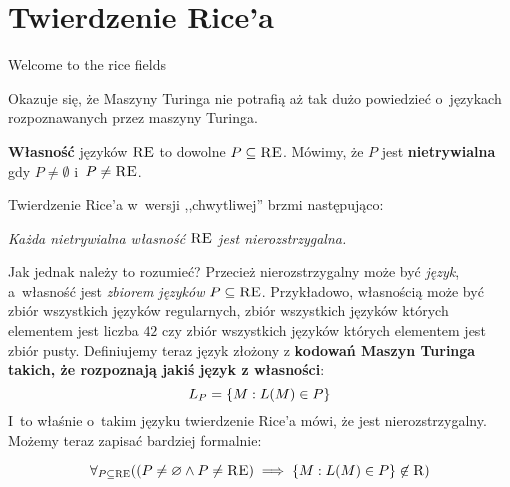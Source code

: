 \section{Twierdzenie Rice'a}
\epigraph{Welcome to the rice fields}{}


Okazuje się, że Maszyny Turinga nie potrafią aż tak dużo powiedzieć o~językach rozpoznawanych przez maszyny Turinga.

\begin{definition}
    \textbf{Własność} języków \(\textsc{RE}\) to dowolne \(P \subseteq \textsc{RE}\). Mówimy, że \(P\) jest \textbf{nietrywialna} gdy \(P \neq \emptyset\) i~\(P \neq \textsc{RE}\).
\end{definition}

Twierdzenie Rice'a w~wersji ,,chwytliwej'' brzmi następująco:
\begin{center}
    \emph{Każda nietrywialna własność \(\textsc{RE}\) jest nierozstrzygalna.}
\end{center}
Jak jednak należy to rozumieć? Przecież nierozstrzygalny może być \emph{język}, a~własność jest \emph{zbiorem języków} \(P \subseteq \textsc{RE}\). Przykładowo, własnością może być zbiór wszystkich języków regularnych, zbiór wszystkich języków których elementem jest liczba \(42\) czy zbiór wszystkich języków których elementem jest zbiór pusty. Definiujemy teraz język złożony z \textbf{kodowań Maszyn Turinga takich, że rozpoznają jakiś język z własności}:
\[
    L_P = \set{M : L\pars{M} \in P}
\]
I~to właśnie o~takim języku twierdzenie Rice'a mówi, że jest nierozstrzygalny. Możemy teraz zapisać bardziej formalnie:
\begin{theorem}[Rice]
    \[
        \forall_{P \subseteq \re}\pars{\pars{P \neq \emptyset \land P \neq \re} \implies \set{M : L\pars{M} \in P} \not\in \r}
    \]
\end{theorem}
